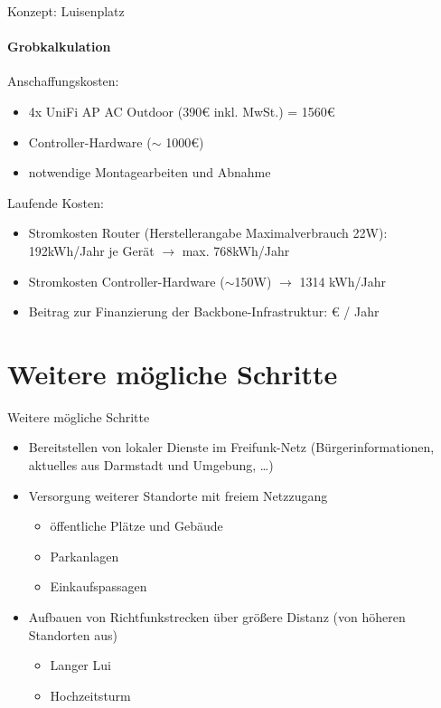 \documentclass{beamer}
\begin{document}
\begin{frame}{Konzept: Luisenplatz}
\framesubtitle{Grobkalkulation}
Anschaffungskosten:
\begin{itemize}
	\item 4x UniFi AP AC Outdoor (390\euro{} inkl. MwSt.) = 1560\euro{}
	\item Controller-Hardware ($\sim$ 1000\euro{})
	\item notwendige Montagearbeiten und Abnahme
\end{itemize}
\vfill
Laufende Kosten:
\begin{itemize}
	\item Stromkosten Router (Herstellerangabe Maximalverbrauch 22W):\newline
	192kWh/Jahr je Gerät $\rightarrow$ max. 768kWh/Jahr
	\item Stromkosten Controller-Hardware \newline
	($\sim$150W) $\rightarrow$ 1314 kWh/Jahr
	\item Beitrag zur Finanzierung der Backbone-Infrastruktur:  \euro{} / Jahr
\end{itemize}
\end{frame}


\section{Weitere mögliche Schritte}
\begin{frame}{Weitere mögliche Schritte}
\begin{itemize}
\item Bereitstellen von lokaler Dienste im Freifunk-Netz (Bürgerinformationen, aktuelles aus Darmstadt und Umgebung, \ldots)
\item Versorgung weiterer Standorte mit freiem Netzzugang
\begin{itemize}
	\item öffentliche Plätze und Gebäude
	\item Parkanlagen
	\item Einkaufspassagen
\end{itemize}
\item Aufbauen von Richtfunkstrecken über größere Distanz (von höheren Standorten aus)
\begin{itemize}
	\item Langer Lui
	\item Hochzeitsturm
\end{itemize}
\end{itemize}
\vfill
\end{frame}
\end{document}
